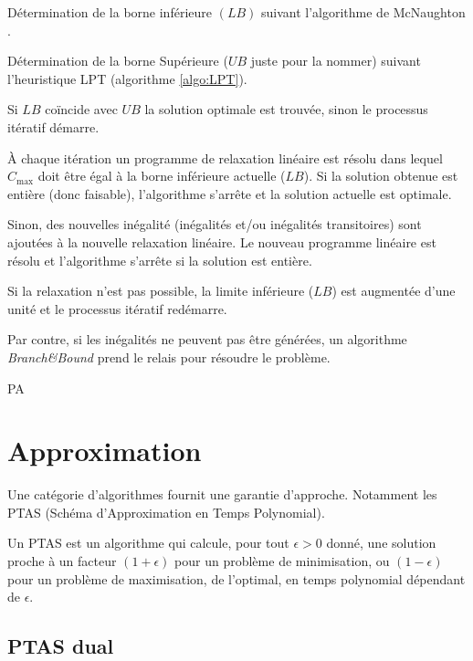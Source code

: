 \documentclass[a4paper,12pt]{report}
\theoremstyle{plain}				%
\theoremstyle{definition}				%
\begin{document}
\bigskip
\begin{algorithm}[H]
\DontPrintSemicolon

Détermination de la borne inférieure $(LB)$ suivant l'algorithme de
McNaughton \cite{mcnaughton1959scheduling}.

\BlankLine %
Détermination de la borne Supérieure ($UB$ juste pour la nommer)
suivant l'heuristique LPT (algorithme \ref{algo:LPT}).

\BlankLine %
Si $LB$ coïncide avec $UB$ la solution optimale est trouvée, sinon le
processus itératif démarre.

\BlankLine
À chaque itération un programme de relaxation linéaire est résolu dans
lequel $C_{\max}$ doit être égal à la borne inférieure actuelle
($LB$).
Si la solution obtenue est entière (donc faisable), l'algorithme
s'arrête et la solution actuelle est optimale.

\BlankLine
Sinon, des nouvelles inégalité (inégalités et/ou inégalités
transitoires) sont ajoutées à la nouvelle relaxation linéaire. Le
nouveau programme linéaire est résolu et l'algorithme s'arrête si la
solution est entière.

\BlankLine
Si la relaxation n'est pas possible, la limite inférieure ($LB$) est
augmentée d'une unité et le processus itératif redémarre.

\BlankLine
Par contre, si les inégalités ne peuvent pas être générées, un
algorithme \emph{Branch\&Bound} prend le relais pour résoudre le
problème.

\caption{PA\label{algo:PA}}
\end{algorithm}


\section{Approximation}

Une catégorie d'algorithmes fournit une garantie d'approche.
Notamment les PTAS (Schéma d'Approximation en Temps Polynomial).

Un PTAS est un algorithme qui calcule, pour tout $\epsilon > 0$ donné,
une solution proche à un facteur $(1+\epsilon)$ pour un problème de
minimisation, ou $(1-\epsilon)$ pour un problème de maximisation, de
l'optimal, en temps polynomial dépendant de $\epsilon$.


\subsection{PTAS dual} %
\end{document}
